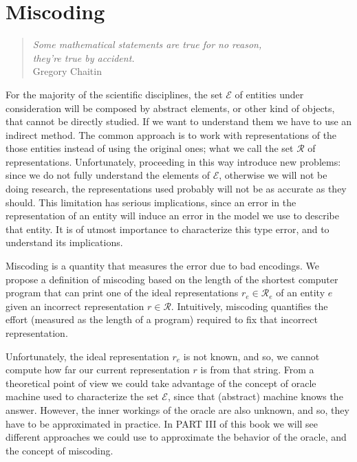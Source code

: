 %
%


\chapter{Miscoding}
\label{chap:Miscoding}

\begin{quote}
\begin{flushright}
\emph{Some mathematical statements are true for no reason,\\
they're true by accident.}\\
Gregory Chaitin
\end{flushright}
\end{quote}
\bigskip

For the majority of the scientific disciplines, the set $\mathcal{E}$ of entities under consideration will be composed by abstract elements, or other kind of objects, that cannot be directly studied. If we want to understand them we have to use an indirect method. The common approach is to work with representations of the those entities instead of using the original ones; what we call the set $\mathcal{R}$ of representations. Unfortunately, proceeding in this way introduce new problems: since we do not fully understand the elements of $\mathcal{E}$, otherwise we will not be doing research, the representations used probably will not be as accurate as they should. This limitation has serious implications, since an error in the representation of an entity will induce an error in the model we use to describe that entity. It is of utmost importance to characterize this type error, and to understand its implications.

Miscoding is a quantity that measures the error due to bad encodings. We propose a definition of miscoding based on the length of the shortest computer program that can print one of the ideal representations $r_e \in \mathcal{R}_e$ of an entity $e$ given an incorrect representation $r \in \mathcal{R}$. Intuitively, miscoding quantifies the effort (measured as the length of a program) required to fix that incorrect representation.

Unfortunately, the ideal representation $r_e$ is not known, and so, we cannot compute how far our current representation $r$ is from that string. From a theoretical point of view we could take advantage of the concept of oracle machine used to characterize the set $\mathcal{E}$, since that (abstract) machine knows the answer. However, the inner workings of the oracle are also unknown, and so, they have to be approximated in practice. In PART III of this book we will see different approaches we could use to approximate the behavior of the oracle, and the concept of miscoding.

